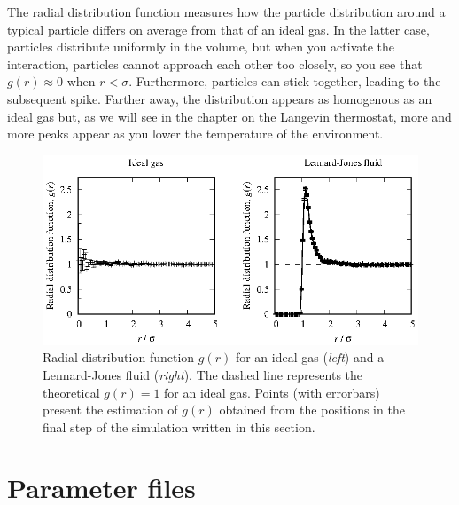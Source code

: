The radial distribution function measures how the particle distribution around a
typical particle differs on average from that of an ideal gas. In the latter
case, particles distribute uniformly in the volume, but when you activate the
interaction, particles cannot approach each other too closely, so you see that
$g(r) \approx 0$ when $r < \sigma$. Furthermore, particles can stick together,
leading to the subsequent spike. Farther away, the distribution appears as
homogenous as an ideal gas but, as we will see in the chapter on the Langevin
thermostat, more and more peaks appear as you lower the temperature of the
environment.

\begin{figure}
  \includegraphics[width = \textwidth]{figures/Lennard-Jones.rdf.eps}
  \caption{\label{Lennard-Jones.rdf}Radial distribution function $g(r)$ for an
           ideal gas (\textit{left}) and a Lennard-Jones fluid (\textit{right}).
           The dashed line represents the theoretical $g(r) = 1$ for an ideal
           gas. Points (with errorbars) present the estimation of $g(r)$
           obtained from the positions in the final step of the simulation
           written in this section.}
\end{figure}

\section{Parameter files}

